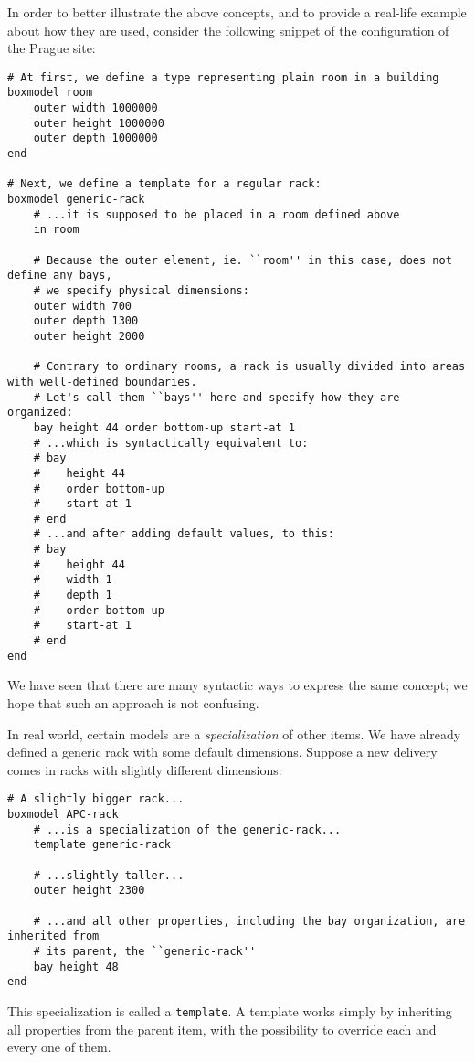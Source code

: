 \documentclass[11pt]{article}
\begin{document}
In order to better illustrate the above concepts, and to provide a real-life
example about how they are used, consider the following snippet of the
configuration of the Prague site:

{\scriptsize
\begin{verbatim}
# At first, we define a type representing plain room in a building
boxmodel room
    outer width 1000000
    outer height 1000000
    outer depth 1000000
end

# Next, we define a template for a regular rack:
boxmodel generic-rack
    # ...it is supposed to be placed in a room defined above
    in room

    # Because the outer element, ie. ``room'' in this case, does not define any bays,
    # we specify physical dimensions:
    outer width 700
    outer depth 1300
    outer height 2000

    # Contrary to ordinary rooms, a rack is usually divided into areas with well-defined boundaries.
    # Let's call them ``bays'' here and specify how they are organized:
    bay height 44 order bottom-up start-at 1
    # ...which is syntactically equivalent to:
    # bay
    #    height 44
    #    order bottom-up
    #    start-at 1
    # end
    # ...and after adding default values, to this:
    # bay
    #    height 44
    #    width 1
    #    depth 1
    #    order bottom-up
    #    start-at 1
    # end
end
\end{verbatim}
}

We have seen that there are many syntactic ways to express the same concept; we
hope that such an approach is not confusing.

In real world, certain models are a {\em specialization} of other items.  We
have already defined a generic rack with some default dimensions.  Suppose a new
delivery comes in racks with slightly different dimensions:

{\scriptsize
\begin{verbatim}
# A slightly bigger rack...
boxmodel APC-rack
    # ...is a specialization of the generic-rack...
    template generic-rack

    # ...slightly taller...
    outer height 2300

    # ...and all other properties, including the bay organization, are inherited from
    # its parent, the ``generic-rack''
    bay height 48
end
\end{verbatim}
}

This specialization is called a {\tt template}.  A template works simply by
inheriting all properties from the parent item, with the possibility to override
each and every one of them.
\end{document}

